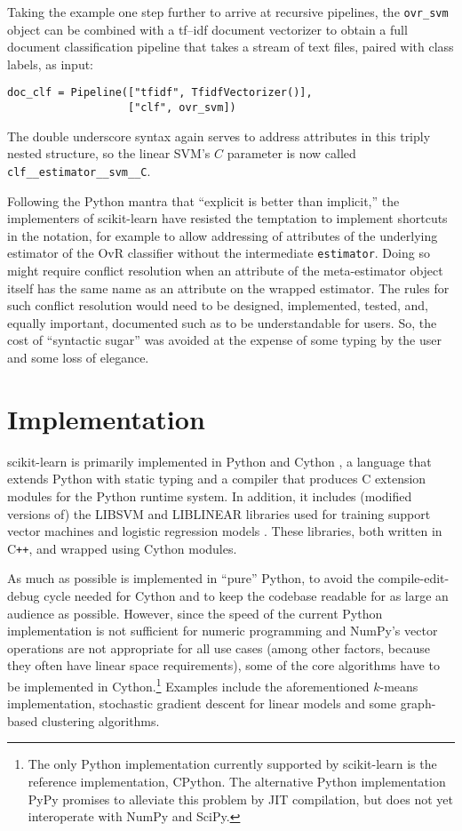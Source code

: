 \documentclass[a4paper,twocolumn]{article}
\begin{document}
Taking the example one step further to arrive at recursive pipelines,
the \texttt{ovr\_svm} object can be combined
with a \textsf{tf--idf} document vectorizer
to obtain a full document classification pipeline
that takes a stream of text files, paired with class labels, as input:

\begin{verbatim}
doc_clf = Pipeline(["tfidf", TfidfVectorizer()],
                   ["clf", ovr_svm])
\end{verbatim}

The double underscore syntax again serves to address attributes
in this triply nested structure,
so the linear SVM's $C$ parameter
is now called \texttt{clf\_\_estimator\_\_svm\_\_C}.

Following the Python mantra that ``explicit is better than implicit,''
the implementers of scikit-learn have resisted the temptation
to implement shortcuts in the notation,
for example to allow addressing of attributes
of the underlying estimator of the OvR classifier
without the intermediate \texttt{estimator}.
Doing so might require conflict resolution
when an attribute of the meta-estimator object itself
has the same name as an attribute on the wrapped estimator.
The rules for such conflict resolution would need to be
designed, implemented, tested, and, equally important, documented
such as to be understandable for users.
So, the cost of ``syntactic sugar'' was avoided
at the expense of some typing by the user and some loss of elegance.

\section{Implementation}

scikit-learn is primarily implemented in Python and Cython
\citep{behnel2011cython},
a language that extends Python with static typing
and a compiler that produces C extension modules
for the Python runtime system.
In addition, it includes (modified versions of)
the \textsf{LIBSVM} and \textsf{LIBLINEAR} libraries
used for training support vector machines
and logistic regression models \citep{chang2011libsvm, fan2008}.
These libraries, both written in C{}\verb!++!,
and wrapped using Cython modules.

As much as possible is implemented in ``pure'' Python,
to avoid the compile-edit-debug cycle needed for Cython
and to keep the codebase readable for as large an audience as possible.
However, since the speed of the current Python implementation
is not sufficient for numeric programming
and NumPy's vector operations are not appropriate for all use cases
(among other factors, because they often have linear space requirements),
some of the core algorithms have to be implemented in Cython.\footnote{
  The only Python implementation currently supported by scikit-learn
  is the reference implementation, CPython.
  The alternative Python implementation PyPy \citep{bolz2009tracing}
  promises to alleviate this problem by JIT compilation,
  but does not yet interoperate with NumPy and SciPy.
}
Examples include the aforementioned $k$-means implementation,
stochastic gradient descent for linear models
and some graph-based clustering algorithms.
\end{document}
